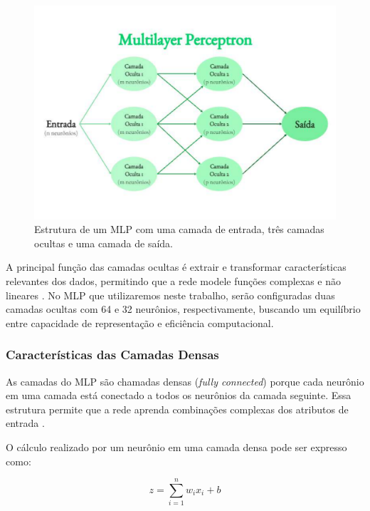 \begin{figure}[h]
    \captionsetup{font=footnotesize, position=above}
    \caption{Estrutura de um MLP com uma camada de entrada, três camadas ocultas e uma camada de saída.}
    \label{fig:biopsiaPGT-A}
    \centering
    \includegraphics[scale=0.35]{figuras/multilayer.pdf}
    \vspace{0.3cm}
\end{figure}
\FloatBarrier

A principal função das camadas ocultas é extrair e transformar características relevantes dos dados, permitindo que a rede modele funções complexas e não lineares \cite{haykin2009}. No MLP que utilizaremos neste trabalho, serão configuradas duas camadas ocultas com 64 e 32 neurônios, respectivamente, buscando um equilíbrio entre capacidade de representação e eficiência computacional.

\subsubsection{Características das Camadas Densas}

As camadas do MLP são chamadas densas (\textit{fully connected}) porque cada neurônio em uma camada está conectado a todos os neurônios da camada seguinte. Essa estrutura permite que a rede aprenda combinações complexas dos atributos de entrada \cite{haykin2009}.

O cálculo realizado por um neurônio em uma camada densa pode ser expresso como:

\begin{equation}
    z = \sum_{i=1}^{n} w_i x_i + b
\end{equation}

